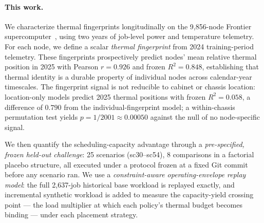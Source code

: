 \paragraph{This work.}
We characterize thermal fingerprints longitudinally on the 9{,}856-node
Frontier supercomputer~\cite{TODO:frontier}, using two years of job-level
power and temperature telemetry. For each node, we define a scalar
\emph{thermal fingerprint} from 2024 training-period telemetry. These
fingerprints prospectively predict nodes' mean relative thermal position in
2025 with Pearson $r = 0.926$
and frozen $R^2 = 0.848$,
establishing that thermal identity is a durable property of individual nodes
across calendar-year timescales. The fingerprint signal is not reducible to
cabinet or chassis location: location-only models predict 2025 thermal
positions with frozen $R^2 = 0.058$, a difference of $0.790$ from the
individual-fingerprint model; a within-chassis permutation test yields
$p = 1/2001 \approx 0.00050$ against the null of no node-specific signal.

We then quantify the scheduling-capacity advantage through a
\emph{pre-specified, frozen held-out challenge}: 25 scenarios (sc30--sc54), 8
comparisons in a factorial placebo structure, all executed under a protocol
frozen at a fixed Git commit before any scenario ran. We use a
\emph{constraint-aware operating-envelope replay model}: the full 2{,}637-job
historical base workload is replayed exactly, and incremental synthetic
workload is added to measure the capacity-yield crossing point — the load
multiplier at which each policy's thermal budget becomes binding — under each
placement strategy.

